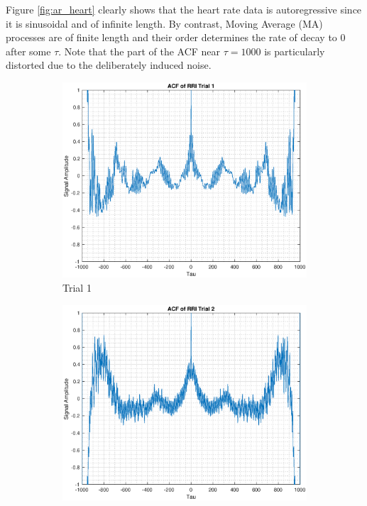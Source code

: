 \documentclass{article}
\begin{document}
Figure \ref{fig:ar_heart} clearly shows that the heart rate data is autoregressive since it is sinusoidal and of infinite length. By contrast, Moving Average (MA) processes are of finite length and their order determines the rate of decay to 0 after some $\tau$. Note that the part of the ACF near $\tau=1000$ is particularly distorted due to the deliberately induced noise.

\begin{figure}[h!]
\centering
\begin{subfigure}{0.32\textwidth}
\centering
\includegraphics[width = \textwidth]{heart_acf_t1}
\caption{Trial 1}
\label{fig:heart_acf_t1}
\end{subfigure}
\begin{subfigure}{0.32\textwidth}
\centering
\includegraphics[width = \textwidth]{heart_acf_t2}

\end{subfigure}
\end{figure}
\end{document}
